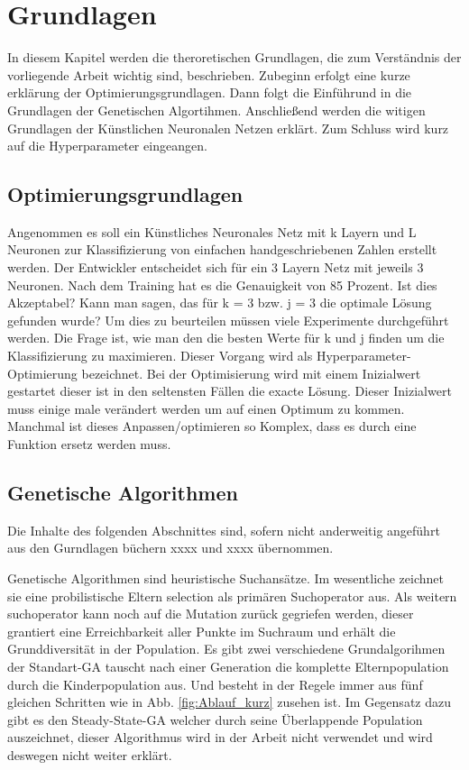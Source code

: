 \section{Grundlagen}
\label{sec:Grundlagen}
In diesem Kapitel werden die theroretischen Grundlagen, die zum Verständnis der vorliegende Arbeit wichtig sind, beschrieben. Zubeginn erfolgt eine kurze erklärung der Optimierungsgrundlagen. Dann folgt die Einführund in die Grundlagen der Genetischen Algortihmen. Anschließend werden die witigen Grundlagen der Künstlichen Neuronalen Netzen erklärt. Zum Schluss wird kurz auf die Hyperparameter eingeangen.


\subsection{Optimierungsgrundlagen}
Angenommen es soll ein Künstliches Neuronales Netz mit k Layern und L Neuronen zur Klassifizierung von einfachen handgeschriebenen Zahlen erstellt werden. Der Entwickler entscheidet sich für ein 3 Layern Netz mit jeweils 3 Neuronen. Nach dem Training hat es die Genauigkeit von 85 Prozent. Ist dies Akzeptabel? Kann man sagen, das für k = 3 bzw. j = 3 die optimale Lösung gefunden wurde? Um dies zu beurteilen müssen viele Experimente durchgeführt werden. Die Frage ist, wie man den die besten Werte für k und j finden um die Klassifizierung zu maximieren. Dieser Vorgang wird als Hyperparameter-Optimierung bezeichnet. Bei der Optimisierung wird mit einem Inizialwert gestartet dieser ist in den seltensten Fällen die exacte Lösung. Dieser Inizialwert muss einige male verändert werden um auf einen Optimum zu kommen. Manchmal ist dieses Anpassen/optimieren so Komplex, dass es durch eine Funktion ersetz werden muss.


\subsection{Genetische Algorithmen}

Die Inhalte des folgenden Abschnittes sind, sofern nicht anderweitig angeführt aus den Gurndlagen büchern xxxx und xxxx übernommen. 

Genetische Algorithmen sind heuristische Suchansätze. Im wesentliche zeichnet sie eine probilistische Eltern selection als primären Suchoperator aus. Als weitern suchoperator kann noch auf die Mutation zurück gegriefen werden, dieser grantiert eine Erreichbarkeit aller Punkte im Suchraum und erhält die Grunddiversität in der Population. Es gibt zwei verschiedene Grundalgorihmen der Standart-GA tauscht nach einer Generation die komplette Elternpopulation durch die Kinderpopulation aus. Und besteht in der Regele immer aus fünf gleichen Schritten wie in Abb. \ref{fig:Ablauf_kurz} zusehen ist. Im Gegensatz dazu gibt es den Steady-State-GA welcher durch seine Überlappende Population auszeichnet, dieser Algorithmus wird in der Arbeit nicht verwendet und wird deswegen nicht weiter erklärt. 

